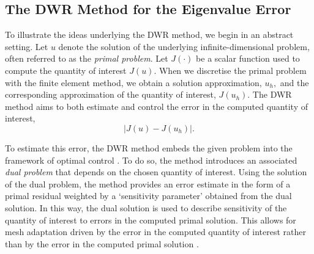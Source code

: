 



\subsection{The DWR Method for the Eigenvalue Error}


To illustrate the ideas underlying the DWR method, we begin in an abstract setting. 
Let $u$ denote the solution of the underlying infinite-dimensional problem, often referred to as the \textit{primal problem}. Let $J(\cdot)$ be a scalar function used to compute the quantity of interest $J(u).$ When we discretise the primal problem with the finite element method, we obtain a solution approximation, $u_h,$ and the corresponding approximation of the quantity of interest, $J(u_h).$ The DWR method aims to both estimate and control the error in the computed quantity of interest,
\begin{equation}
    |J(u) - J(u_h)|.
\end{equation}

 
To estimate this error, the DWR method embeds the given problem into the framework of optimal control \cite{Becker}. To do so, the method introduces an associated \textit{dual problem} that depends on the chosen quantity of interest. Using the solution of the dual problem, the method provides an error estimate in the form of a primal residual weighted by a `sensitivity parameter' obtained from the dual solution.  In this way, the dual solution is used to describe sensitivity of the quantity of interest to errors in the computed primal solution. This allows for mesh adaptation driven by the error in the computed quantity of interest rather than by the error in the computed primal solution \cite{Giles97, Giles1997Adjoint, Becker, Bangerth}.


